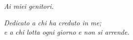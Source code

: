 \null{}
\begin{flushright}
	\textit{Ai miei genitori.}\par
	\textit{Dedicato a chi ha creduto in me;}\\
	\textit{e a chi lotta ogni giorno e non si arrende.}\par
\end{flushright}
\null
